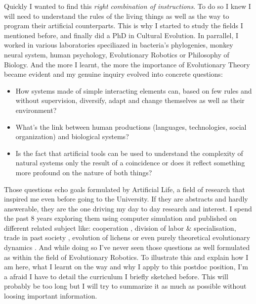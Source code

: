 \documentclass[10pt]{article}
\begin{document}
Quickly I wanted to find this \emph{right combination of instructions}. To do so I knew I will need to understand the rules of the living things as well as the way to program their artificial counterparts.  This is why I started to study the fields I mentioned before, and finally did a PhD in Cultural Evolution. In parrallel, I worked in various laboratories speciliazed in bacteria's phylogenies, monkey neural system, human psychology, Evolutionary Robotics or Philosophy of Biology. And the more I learnt, the more the importance of Evolutionary Theory became evident and my genuine inquiry evolved into concrete questions: 
\begin{itemize}
    \item How systems made of simple interacting elements can, based on few rules and without supervision, diversify, adapt and change themselves as well as their environment?
    \item What's the link between human productions (languages, technologies, social organization) and biological systems? 
    \item Is the fact that artificial tools can be used to understand the complexity of natural systems only the result of a coincidence or does it reflect something more profound on the nature of both things?
\end{itemize}
Those questions echo goals formulated by  Artificial Life, a field of research that inspired me even before going to the University. If they are abstracts and hardly answerable, they are the one driving my day to day research and interest. 
I spend the past 8 years exploring them using computer simulation and published on different related subject like: cooperation \cite{zibetti2015acaciaesanagentbasedmodelingandsimulationtoolforinvestigatingsocialbehaviorsinresourcelimitedtwodimensionalenvironments}, division of labor \& specialisation\cite{montanier2016behavioralspecializationinembodiedevolutionaryroboticswhysodifficult,bredeche2017benefitsofproportionateselectioninembodiedevolutionacasestudywithbehaviouralspecialization}, trade in past society \cite{carrignon2015modelingthecoevolutionoftradeandcultureinpastsocieties}, evolution of lichens \cite{carrignon2016lichen} or even purely theoretical evolutionary dynamics \cite{medernach2015evolutionary,medernach2016evolution}.
And while doing so I've never seen those questions as well formulated as within the field of Evolutionary Robotics. To illustrate this and explain how I am here, what I learnt on the way and why I apply to this postdoc position, I'm a afraid I have to detail the curriculum I briefly sketched before. This will probably be too long but I will try to summarize it as much as possible without loosing important information.
\end{document}
